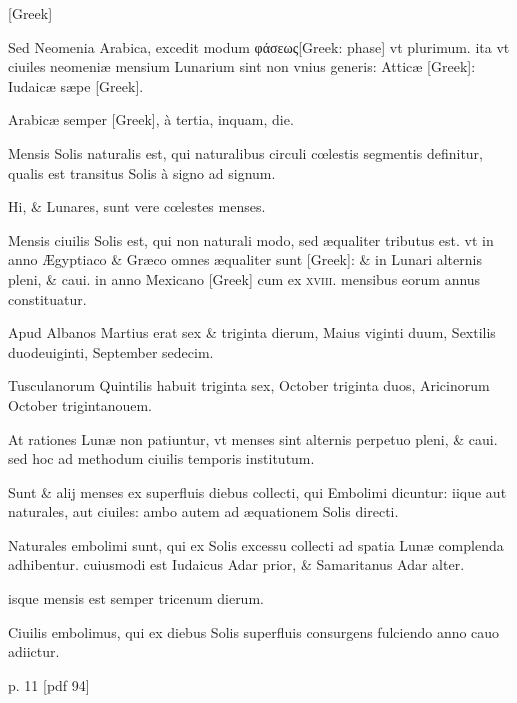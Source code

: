 \begin{parnumbers}
\begin{greek}
\textgreek{[Greek]}
\end{greek}

Sed Neomenia Arabica, excedit modum
 \textgreek{φάσεως[Greek: phase]} vt plurimum. ita vt
ciuiles neomeniæ mensium Lunarium sint non vnius generis: Atticæ 
\textgreek{[Greek]}: Iudaicæ sæpe \textgreek{[Greek]}.

Arabicæ semper \textgreek{[Greek]},
à tertia, inquam, die.

Mensis Solis naturalis est,
qui naturalibus circuli cœlestis segmentis definitur, qualis est transitus
Solis à signo ad signum.

Hi, \& Lunares, sunt vere cœlestes menses.

Mensis ciuilis Solis est, qui non naturali modo, sed æqualiter tributus
est. vt in anno Ægyptiaco \& Græco omnes æqualiter sunt \textgreek{[Greek]}:
\& in Lunari alternis pleni, \& caui. in anno Mexicano \textgreek{[Greek]}
cum ex \textsc{xviii}. mensibus eorum annus constituatur.

Apud Albanos
Martius erat sex \& triginta dierum, Maius viginti duum, Sextilis
duodeuiginti, September sedecim.

Tusculanorum Quintilis habuit
triginta sex, October triginta duos, Aricinorum October trigintanouem.

At rationes Lunæ non patiuntur, vt menses sint alternis
perpetuo pleni, \& caui. sed hoc ad methodum ciuilis temporis institutum.

Sunt \& alij menses ex superfluis diebus collecti, qui Embolimi
dicuntur: iique aut naturales, aut ciuiles: ambo autem ad æquationem
Solis directi.

Naturales embolimi sunt, qui ex Solis excessu collecti
ad spatia Lunæ complenda adhibentur. cuiusmodi est Iudaicus
Adar prior, \& Samaritanus Adar alter.

isque mensis est semper tricenum dierum.

Ciuilis embolimus, qui ex diebus Solis superfluis consurgens
fulciendo anno cauo adiictur.

\end{parnumbers}
\clearpage
p. 11 [pdf 94]
